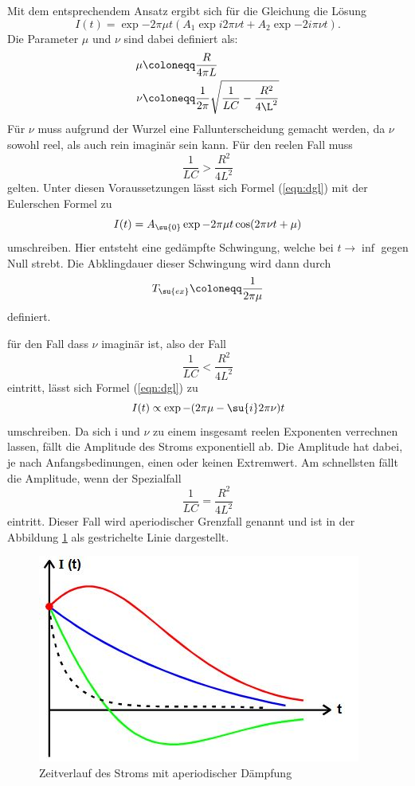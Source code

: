 Mit dem entsprechendem Ansatz ergibt sich für die Gleichung die Lösung
\begin{equation}
  I(t)=\exp{-2\pi\mu t}(A_1\exp{i2\pi\nu t} + A_2\exp{-2i\pi\nu t}).
  \label{eqn:dgl}
\end{equation}
Die Parameter $\mu$ und $\nu$ sind dabei definiert als:
\begin{align*}
  \mu &\coloneqq\frac{R}{4\pi L} \\
  \nu &\coloneqq\frac{1}{2\pi}\sqrt{\frac{1}{LC}-\frac{R^2}{4\L^2}}
\end{align*}
Für $\nu$ muss aufgrund der Wurzel eine Fallunterscheidung gemacht werden, da
$\nu$ sowohl reel, als auch rein imaginär sein kann.
Für den reelen Fall muss
\begin{equation*}
  \frac{1}{LC} > \frac{R^2}{4L^2}
\end{equation*}
gelten. Unter diesen Voraussetzungen lässt sich Formel (\ref{eqn:dgl}) mit der
Eulerschen Formel zu
\begin{equation}
  I(t)=A_\su{0}\exp{-2\pi\mu t}\cos(2\pi\nu t+\mu)
\end{equation}
umschreiben. Hier entsteht eine gedämpfte Schwingung, welche bei $t\rightarrow\inf$
gegen Null strebt. Die Abklingdauer dieser Schwingung wird dann durch
\begin{equation}
  T_\su{ex}\coloneqq\frac{1}{2\pi\mu}
\end{equation}
definiert.

für den Fall dass $\nu$ imaginär ist, also der Fall
\begin{equation*}
  \frac{1}{LC} < \frac{R^2}{4L^2}
\end{equation*}
eintritt, lässt sich Formel (\ref{eqn:dgl}) zu
\begin{equation}
  I(t)\propto\exp{-(2\pi\mu -\su{i}2\pi\nu)t}
\end{equation}
umschreiben.
Da sich i und $\nu$ zu einem insgesamt reelen Exponenten verrechnen lassen, fällt
die Amplitude des Stroms exponentiell ab. Die Amplitude hat dabei, je nach
Anfangsbedinungen, einen oder keinen Extremwert. Am schnellsten fällt die
Amplitude, wenn der Spezialfall
\begin{equation*}
  \frac{1}{LC} = \frac{R^2}{4L^2}
\end{equation*}
eintritt. Dieser Fall wird aperiodischer Grenzfall genannt und ist in der
Abbildung \ref{fig:agf} als gestrichelte Linie dargestellt.
\begin{figure}[h]
  \centering
  \includegraphics{Bilder/aperiod.JPG}
  \caption{Zeitverlauf des Stroms mit aperiodischer Dämpfung\cite{354}}
  \label{fig:agf}
\end{figure}
